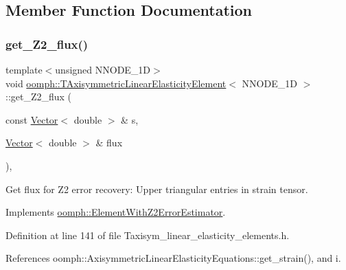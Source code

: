 \subsection{Member Function Documentation}
\mbox{\label{classoomph_1_1TAxisymmetricLinearElasticityElement_af2c386150c3beb3e4f92cad017b12e1f}} 
\subsubsection{\texorpdfstring{get\+\_\+\+Z2\+\_\+flux()}{get\_Z2\_flux()}}
{\footnotesize\ttfamily template$<$unsigned N\+N\+O\+D\+E\+\_\+1D$>$ \\
void \hyperlink{classoomph_1_1TAxisymmetricLinearElasticityElement}{oomph\+::\+T\+Axisymmetric\+Linear\+Elasticity\+Element}$<$ N\+N\+O\+D\+E\+\_\+1D $>$\+::get\+\_\+\+Z2\+\_\+flux (\begin{DoxyParamCaption}\item[{const \hyperlink{classoomph_1_1Vector}{Vector}$<$ double $>$ \&}]{s,  }\item[{\hyperlink{classoomph_1_1Vector}{Vector}$<$ double $>$ \&}]{flux }\end{DoxyParamCaption})\hspace{0.3cm}{\ttfamily [inline]}, {\ttfamily [virtual]}}



Get \textquotesingle{}flux\textquotesingle{} for Z2 error recovery\+: Upper triangular entries in strain tensor. 



Implements \hyperlink{classoomph_1_1ElementWithZ2ErrorEstimator_a5688ff5f546d81771cabad82ca5a7556}{oomph\+::\+Element\+With\+Z2\+Error\+Estimator}.



Definition at line 141 of file Taxisym\+\_\+linear\+\_\+elasticity\+\_\+elements.\+h.



References oomph\+::\+Axisymmetric\+Linear\+Elasticity\+Equations\+::get\+\_\+strain(), and i.

\mbox{\label{classoomph_1_1TAxisymmetricLinearElasticityElement_a0e59e9e92b5e6414a2da13a2b782a155}} 
